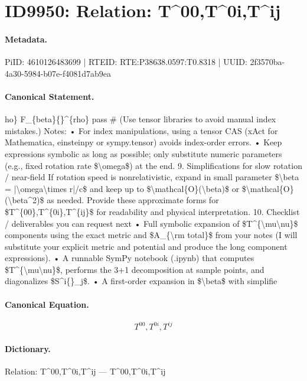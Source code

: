 \section*{ID9950: Relation: T\textasciicircum{}00,T\textasciicircum{}0i,T\textasciicircum{}ij}
\paragraph{Metadata.}
PiID: 4610126483699 | RTEID: RTE:P38638.0597:T0.8318 | UUID: 2f3570ba-4a30-5984-b07e-f4081d7ab9ea

\paragraph{Canonical Statement.}
ho\} F\_\{beta\}\{\}\textasciicircum{}\{rho\} pass \# (Use tensor libraries to avoid manual index mistakes.) Notes: • For index manipulations, using a tensor CAS (xAct for Mathematica, einsteinpy or sympy.tensor) avoids index-order errors. • Keep expressions symbolic as long as possible; only substitute numeric parameters (e.g., fixed rotation rate \$\textbackslash{}omega\$) at the end. 9. Simplifications for slow rotation / near-field If rotation speed is nonrelativistic, expand in small parameter \$\textbackslash{}beta = |\textbackslash{}omega\textbackslash{}times r|/c\$ and keep up to \$\textbackslash{}mathcal\{O\}(\textbackslash{}beta)\$ or \$\textbackslash{}mathcal\{O\}(\textbackslash{}beta\textasciicircum{}2)\$ as needed. Provide these approximate forms for \$T\textasciicircum{}\{00\},T\textasciicircum{}\{0i\},T\textasciicircum{}\{ij\}\$ for readability and physical interpretation. 10. Checklist / deliverables you can request next • Full symbolic expansion of \$T\textasciicircum{}\{\textbackslash{}mu\textbackslash{}nu\}\$ components using the exact metric and \$A\_\{\textbackslash{}rm total\}\$ from your notes (I will substitute your explicit metric and potential and produce the long component expressions). • A runnable SymPy notebook (.ipynb) that computes \$T\textasciicircum{}\{\textbackslash{}mu\textbackslash{}nu\}\$, performs the 3+1 decomposition at sample points, and diagonalizes \$S\textasciicircum{}i\{\}\_j\$. • A first-order expansion in \$\textbackslash{}beta\$ with simplifie

\paragraph{Canonical Equation.}
\[
T^{00},T^{0i},T^{ij}
\]

\paragraph{Dictionary.}
Relation: T\textasciicircum{}00,T\textasciicircum{}0i,T\textasciicircum{}ij — T\textasciicircum{}00,T\textasciicircum{}0i,T\textasciicircum{}ij

